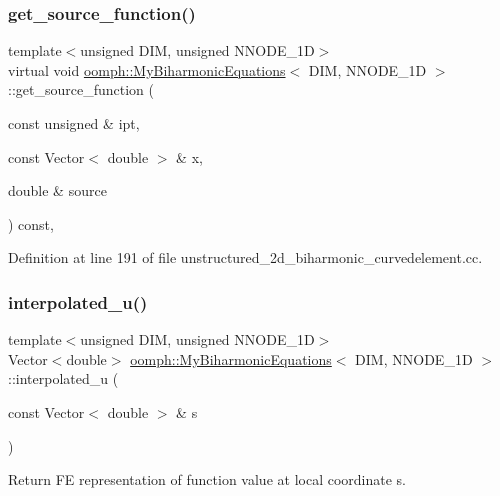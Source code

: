 \subsubsection{\texorpdfstring{get\+\_\+source\+\_\+function()}{get\_source\_function()}}
{\footnotesize\ttfamily template$<$unsigned D\+IM, unsigned N\+N\+O\+D\+E\+\_\+1D$>$ \\
virtual void \hyperlink{classoomph_1_1MyBiharmonicEquations}{oomph\+::\+My\+Biharmonic\+Equations}$<$ D\+IM, N\+N\+O\+D\+E\+\_\+1D $>$\+::get\+\_\+source\+\_\+function (\begin{DoxyParamCaption}\item[{const unsigned \&}]{ipt,  }\item[{const Vector$<$ double $>$ \&}]{x,  }\item[{double \&}]{source }\end{DoxyParamCaption}) const\hspace{0.3cm}{\ttfamily [inline]}, {\ttfamily [virtual]}}



Definition at line 191 of file unstructured\+\_\+2d\+\_\+biharmonic\+\_\+curvedelement.\+cc.

\mbox{\label{classoomph_1_1MyBiharmonicEquations_ae2de016426ddd5473e7ce32a629a040f}} 
\subsubsection{\texorpdfstring{interpolated\+\_\+u()}{interpolated\_u()}}
{\footnotesize\ttfamily template$<$unsigned D\+IM, unsigned N\+N\+O\+D\+E\+\_\+1D$>$ \\
Vector$<$double$>$ \hyperlink{classoomph_1_1MyBiharmonicEquations}{oomph\+::\+My\+Biharmonic\+Equations}$<$ D\+IM, N\+N\+O\+D\+E\+\_\+1D $>$\+::interpolated\+\_\+u (\begin{DoxyParamCaption}\item[{const Vector$<$ double $>$ \&}]{s }\end{DoxyParamCaption})\hspace{0.3cm}{\ttfamily [inline]}}



Return FE representation of function value at local coordinate s. 



